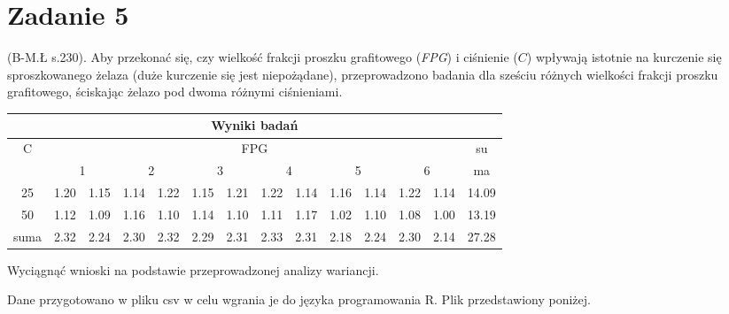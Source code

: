 \documentclass{article}
\begin{document}
\newpage
\section{Zadanie 5}
(B-M.Ł s.230). Aby przekonać się, czy wielkość frakcji proszku grafitowego (\textit{FPG}) i
ciśnienie ($C$) wpływają istotnie na kurczenie się sproszkowanego żelaza (duże kurczenie
się jest niepożądane), przeprowadzono badania dla sześciu różnych wielkości frakcji
proszku grafitowego, ściskając żelazo pod dwoma różnymi ciśnieniami.
\begin{center} \scriptsize \begin{tabular}{|c|c|c|c|c|c|c|c|c|c|c|c|c|c|} 
\multicolumn{14}{c}{Wyniki badań} \\ \hline
C & \multicolumn{12}{|c|}{FPG} & su \\ \cline{2-13}
& \multicolumn{2}{|c|}{1} & \multicolumn{2}{|c|}{2} & \multicolumn{2}{|c|}{3} & \multicolumn{2}{|c|}{4} & \multicolumn{2}{|c|}{5} & \multicolumn{2}{|c|}{6} & ma \\ \hline
25 & 1.20 & 1.15 & 1.14 & 1.22 & 1.15 & 1.21 & 1.22 & 1.14 & 1.16 & 1.14 & 1.22 & 1.14 & 14.09 \\
50 & 1.12 & 1.09 & 1.16 & 1.10 & 1.14 & 1.10 & 1.11 & 1.17 & 1.02 & 1.10 & 1.08 & 1.00 & 13.19 \\ \hline
suma & 2.32 & 2.24 & 2.30 & 2.32 & 2.29 & 2.31 & 2.33 & 2.31 & 2.18 & 2.24 & 2.30 & 2.14 & 27.28 \\ \hline
\end{tabular} \end{center}
Wyciągnąć wnioski na podstawie przeprowadzonej analizy wariancji. \\ \par

Dane przygotowano w pliku csv w celu wgrania je do języka programowania R. Plik przedstawiony poniżej.
\begin{center}
\end{center}
\end{document}
